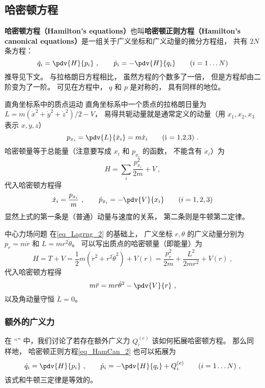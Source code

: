 \subsection{哈密顿方程}
\textbf{哈密顿方程（Hamilton's equations）}也叫\textbf{哈密顿正则方程（Hamilton's canonical equations）}是一组关于广义坐标和广义动量的微分方程组， 共有 $2N$ 条方程：
\begin{equation}\label{eq_HamCan_2}
\dot q_i = \pdv{H}{p_i}~,
\qquad
\dot p_i = -\pdv{H}{q_i}
\qquad
(i = 1\dots N)
\end{equation}
推导见下文。 与拉格朗日方程相比， 虽然方程的个数多了一倍， 但是方程却由二阶变为了一阶。 可见在方程中， $q$ 和 $p$ 是对称的， 具有同样的地位。

\begin{example}{直角坐标系中的质点运动}
直角坐标系中一个质点的拉格朗日量为 $L = m(\dot x^2 + \dot y^2 + \dot z^2)/2 - V$， 易得共轭动量就是通常定义的动量（用 $x_1,x_2,x_3$ 表示 $x, y, z$）
\begin{equation}
p_{x_i} = \pdv{L}{\dot x_i} = m\dot x_i \qquad \text{(i = 1,2,3)}~.
\end{equation}
哈密顿量等于总能量（注意要写成 $x_i$ 和 $p_{x_i}$ 的函数， 不能含有 $\dot x_i$）为
\begin{equation}
H = \sum_i \frac{p_{x_i}^2}{2m} + V~,
\end{equation}
代入哈密顿方程得
\begin{equation}
\dot x_i = \frac{p_{x_i}}{m}~,
\qquad
\dot p_{x_i} = -\pdv{V}{x_i}
\qquad (i = 1,2,3)
\end{equation}
显然上式的第一条是（普通）动量与速度的关系， 第二条则是牛顿第二定律。
\end{example}

\begin{example}{中心力场问题}\label{ex_HamCan_1}
在\autoref{eq_Lagrng_2} 的基础上， 广义坐标 $r, \theta$ 的广义动量分别为 $p_r = m\dot r$ 和 $L = mr^2\dot \theta$。 可以写出质点的哈密顿量（即能量）为
\begin{equation}\label{eq_HamCan_3}
H = T + V = \frac12 m(\dot r^2 + r^2 \dot \theta^2) + V(r) = \frac{p_r^2}{2m} + \frac{L^2}{2mr^2} + V(r)~,
\end{equation}
代入哈密顿方程得
\begin{equation}
m\ddot r = mr \dot \theta^2 - \pdv{V}{r}~,
\end{equation}
以及角动量守恒 $\dot L = 0$。
\end{example}

\subsubsection{额外的广义力}
在 “” 中，我们讨论了若存在额外广义力 $Q_i^{(e)}$ 该如何拓展哈密顿方程。 那么同样地， 哈密顿正则方程\autoref{eq_HamCan_2} 也可以拓展为
\begin{equation}\label{eq_HamCan_5}
\dot q_i = \pdv{H}{p_i}~,
\qquad
\dot p_i = -\pdv{H}{q_i} + Q_i^{(e)}
\qquad
(i = 1\dots N)~,
\end{equation}
该式和牛顿三定律是等效的。


